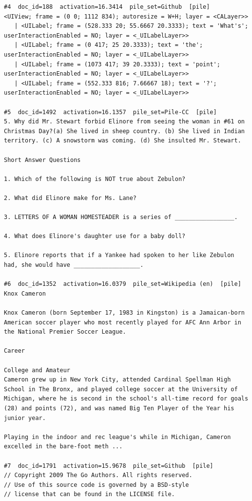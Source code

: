 \begin{verbatim}
#4  doc_id=188  activation=16.3414  pile_set=Github  [pile]
<UIView; frame = (0 0; 1112 834); autoresize = W+H; layer = <CALayer>>
   | <UILabel; frame = (528.333 20; 55.6667 20.3333); text = 'What's'; userInteractionEnabled = NO; layer = <_UILabelLayer>>
   | <UILabel; frame = (0 417; 25 20.3333); text = 'the'; userInteractionEnabled = NO; layer = <_UILabelLayer>>
   | <UILabel; frame = (1073 417; 39 20.3333); text = 'point'; userInteractionEnabled = NO; layer = <_UILabelLayer>>
   | <UILabel; frame = (552.333 816; 7.66667 18); text = '?'; userInteractionEnabled = NO; layer = <_UILabelLayer>>

#5  doc_id=1492  activation=16.1357  pile_set=Pile-CC  [pile]
5. Why did Mr. Stewart forbid Elinore from seeing the woman in #61 on Christmas Day?(a) She lived in sheep country. (b) She lived in Indian territory. (c) A snowstorm was coming. (d) She insulted Mr. Stewart.

Short Answer Questions

1. Which of the following is NOT true about Zebulon?

2. What did Elinore make for Ms. Lane?

3. LETTERS OF A WOMAN HOMESTEADER is a series of _________________.

4. What does Elinore's daughter use for a baby doll?

5. Elinore reports that if a Yankee had spoken to her like Zebulon had, she would have ___________________.

#6  doc_id=1352  activation=16.0379  pile_set=Wikipedia (en)  [pile]
Knox Cameron

Knox Cameron (born September 17, 1983 in Kingston) is a Jamaican-born American soccer player who most recently played for AFC Ann Arbor in the National Premier Soccer League.

Career

College and Amateur
Cameron grew up in New York City, attended Cardinal Spellman High School in The Bronx, and played college soccer at the University of Michigan, where he is second in the school's all-time record for goals (28) and points (72), and was named Big Ten Player of the Year his junior year.

Playing in the indoor and rec league's while in Michigan, Cameron excelled in the bare-foot meth ...

#7  doc_id=1791  activation=15.9678  pile_set=Github  [pile]
// Copyright 2009 The Go Authors. All rights reserved.
// Use of this source code is governed by a BSD-style
// license that can be found in the LICENSE file.


\end{verbatim}
